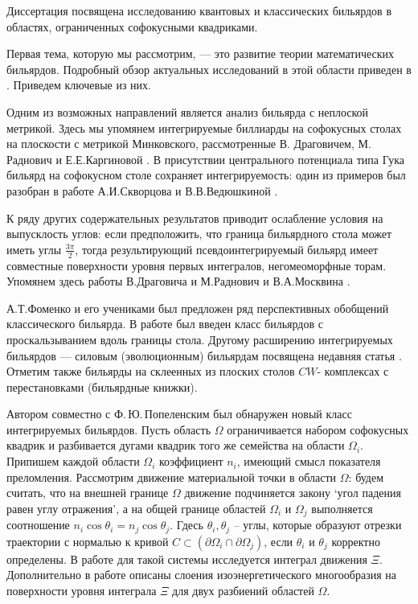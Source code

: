 
{\actuality} 
Диссертация посвящена исследованию квантовых и классических бильярдов в областях, ограниченных софокусными квадриками.

Первая тема, которую мы рассмотрим, --- это развитие теории математических бильярдов.
Подробный обзор актуальных исследований в этой области приведен в \cite{FomVed23}. Приведем ключевые из них.

Одним из возможных направлений является анализ бильярда с неплоской метрикой. Здесь мы упомянем интегрируемые биллиарды на софокусных столах на плоскости с метрикой Минковского, рассмотренные В. Драговичем, М. Раднович \cite{DraRad15} и Е.Е.Каргиновой \cite{Kar19, Kar20}. В присутствии центрального потенциала типа Гука бильярд на софокусном столе сохраняет интегрируемость: один из примеров был разобран в работе А.И.Скворцова и В.В.Ведюшкиной \cite{VedSkv22}.

К ряду других содержательных результатов приводит ослабление условия на выпусклость углов: если предположить, что граница бильярдного стола может иметь углы $\frac{3\pi}{2}$, тогда результирующий псевдоинтегрируемый бильярд имеет совместные поверхности уровня первых интегралов, негомеоморфные торам. Упомянем здесь работы В.Драговича и М.Раднович \cite{zbMATH06376857, DraRad151, zbMATH06467543} и  В.А.Москвина \cite{Mos18, Mos20}. 

А.Т.Фоменко и его учениками был предложен ряд перспективных обобщений классического бильярда. В работе \cite{zbMATH07344445}  был введен класс бильярдов с проскальзыванием вдоль границы стола. Другому расширению интегрируемых бильярдов --- силовым (эволюционным) бильярдам посвящена недавняя статья \cite{FomVed22}. Отметим также бильярды на склеенных из плоских столов $CW$- комплексах с перестановками \cite{VedFom19} (бильярдные книжки).

Автором совместно с Ф.\,Ю.\,Попеленским был обнаружен новый класс интегрируемых бильярдов.
Пусть область $\Omega$ ограничивается набором софокусных квадрик и разбивается дугами квадрик того же семейства на области $\Omega_i$. Припишем каждой области $\Omega_i$ коэффициент $n_i$, имеющий смысл показателя преломления.
Рассмотрим движение материальной точки в области $\Omega$: будем считать, что на внешней границе $\Omega$ движение подчиняется закону `угол падения равен углу отражения', а на общей границе областей $\Omega_i$ и $\Omega_j$ выполняется соотношение $n_i \cos \theta_i = n_j \cos \theta_j$. Гдесь $\theta_i, \theta_j$ -- углы, которые образуют отрезки траектории с нормалью к кривой $C \subset (\partial \Omega_i \cap \partial \Omega_j)$, если $\theta_i$ и $\theta_j$ корректно определены. В работе для такой системы исследуется интеграл движения $\Xi$. Дополнительно в работе описаны слоения изоэнергетического многообразия на поверхности уровня интеграла $\Xi$ для двух разбиений областей $\Omega$. 

